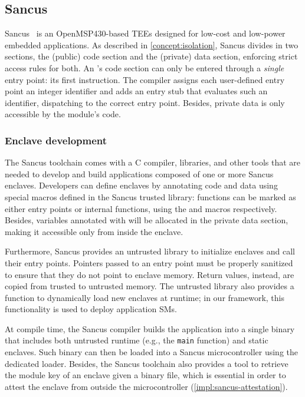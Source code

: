 \subsection{Sancus}
%
\label{impl:sancus}
%
Sancus~\cite{sancus} is an OpenMSP430-based \acp{TEE} designed for low-cost and
low-power embedded applications.  As described in \cref{concept:isolation},
Sancus divides \protmods{} in two sections, the (public) code section and the
(private) data section, enforcing strict access rules for both.  An \protmod{}'s
code section can only be entered through a \emph{single} entry point: its first
instruction. The compiler assigns each user-defined entry point an
integer identifier and adds an entry stub that evaluates such an identifier,
dispatching to the correct entry point. Besides, private data is only accessible
by the module's code.

\subsubsection{Enclave development}
% 
\label{impl:sancus-development}

The Sancus toolchain comes with a C compiler, libraries, and other tools that
are needed to develop and build applications composed of one or more Sancus
enclaves. Developers can define enclaves by annotating code and data using
special macros defined in the Sancus trusted library: functions can be marked as
either entry points or internal functions, using the \smentry{} and \smfunc{}
macros respectively. Besides, variables annotated with \smdata{} will be
allocated in the private data section, making it accessible only from inside the
enclave. 

Furthermore, Sancus provides an untrusted library to initialize enclaves and
call their entry points. Pointers passed to an entry point must be properly
sanitized to ensure that they do not point to enclave memory. Return values,
instead, are copied from trusted to untrusted memory. The untrusted library also
provides a function to dynamically load new enclaves at runtime; in our
framework, this functionality is used to deploy application \acp{SM}.

At compile time, the Sancus compiler builds the application into a single binary
that includes both untrusted runtime (e.g., the \texttt{main} function) and
static enclaves. Such binary can then be loaded into a Sancus microcontroller
using the dedicated loader. Besides, the Sancus toolchain also provides a tool
to retrieve the module key of an enclave given a binary file, which is essential
in order to attest the enclave from outside the microcontroller
(\cref{impl:sancus-attestation}).

